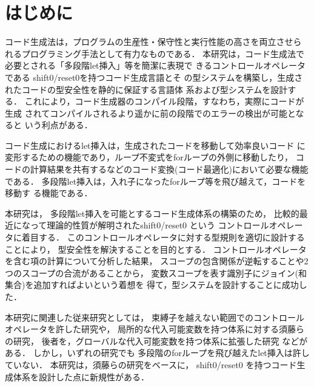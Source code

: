 \chapter{はじめに}
コード生成法は，プログラムの生産性・保守性と実行性能の高さを両立させら
れるプログラミング手法として有力なものである．
本研究は，コード生成法で必要とされる「多段階let挿入」等を簡潔に表現で
きるコントロールオペレータである shift0/reset0を持つコード生成言語とそ
の型システムを構築し，生成されたコードの型安全性を静的に保証する言語体
系および型システムを設計する．
これにより，コード生成器のコンパイル段階，すなわち，実際にコードが生成
されてコンパイルされるより遥かに前の段階でのエラーの検出が可能となると
いう利点がある．

コード生成におけるlet挿入は，生成されたコードを移動して効率良いコード
に変形するための機能であり，ループ不変式をforループの外側に移動したり，
コードの計算結果を共有するなどのコード変換(コード最適化)において必要な機能である．
多段階let挿入は，入れ子になったforループ等を飛び越えて，コードを移動す
る機能である．



本研究は，
多段階let挿入を可能とするコード生成体系の構築のため，
比較的最近になって理論的性質が解明されたshift0/reset0\cite{Materzok2011} という
コントロールオペレータに着目する．
このコントロールオペレータに対する型規則を適切に設計することにより，
型安全性を解決することを目的とする．
コントロールオペレータを含む項の計算について分析した結果，
スコープの包含関係が逆転することや2つのスコープの合流があることから，
変数スコープを表す識別子にジョイン(和集合)を追加すればよいという着想を
得て，型システムを設計することに成功した．

本研究に関連した従来研究としては，
束縛子を越えない範囲でのコントロールオペレータを許した研究や，
局所的な代入可能変数を持つ体系に対する須藤らの研究\cite{Sudo2014}，
後者を，グローバルな代入可能変数を持つ体系に拡張した研究
\cite{Aplas2016}などがある．
しかし，いずれの研究でも 多段階のforループを飛び越えたlet挿入は許していない．
本研究は，須藤らの研究をベースに，
shift0/reset0 を持つコード生成体系を設計した点に新規性がある．

